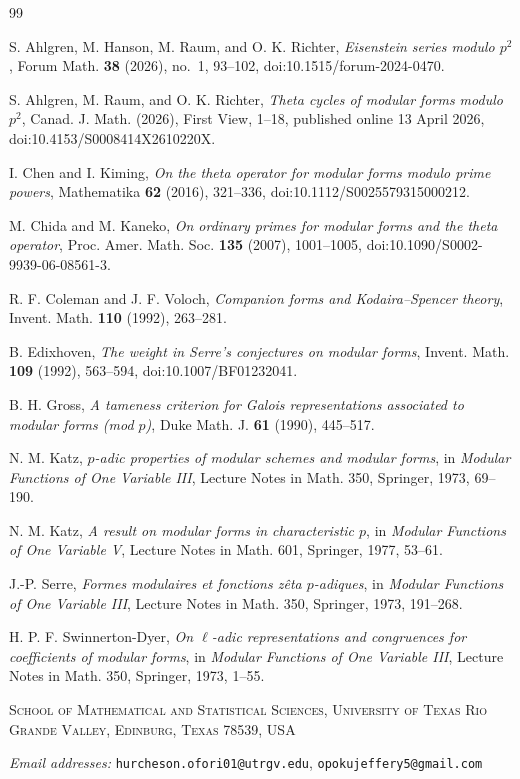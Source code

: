 \documentclass[11pt]{article}
\theoremstyle{remark}
\begin{document}
\begingroup
\small
\begin{thebibliography}{99}
\raggedright
{}
S. Ahlgren, M. Hanson, M. Raum, and O. K. Richter,
\emph{Eisenstein series modulo $p^2$},
Forum Math. \textbf{38} (2026), no.~1, 93--102,
doi:10.1515/forum-2024-0470.

S. Ahlgren, M. Raum, and O. K. Richter,
\emph{Theta cycles of modular forms modulo $p^2$},
Canad. J. Math. (2026), First View, 1--18,
published online 13 April 2026,
doi:10.4153/S0008414X2610220X.

I. Chen and I. Kiming,
\emph{On the theta operator for modular forms modulo prime powers},
Mathematika \textbf{62} (2016), 321--336,
doi:10.1112/S0025579315000212.

M. Chida and M. Kaneko,
\emph{On ordinary primes for modular forms and the theta operator},
Proc. Amer. Math. Soc. \textbf{135} (2007), 1001--1005,
doi:10.1090/S0002-9939-06-08561-3.

R. F. Coleman and J. F. Voloch,
\emph{Companion forms and Kodaira--Spencer theory},
Invent. Math. \textbf{110} (1992), 263--281.

B. Edixhoven,
\emph{The weight in Serre's conjectures on modular forms},
Invent. Math. \textbf{109} (1992), 563--594,
doi:10.1007/BF01232041.

B. H. Gross,
\emph{A tameness criterion for Galois representations associated to
modular forms (mod $p$)},
Duke Math. J. \textbf{61} (1990), 445--517.

N. M. Katz,
\emph{$p$-adic properties of modular schemes and modular forms},
in \emph{Modular Functions of One Variable III},
Lecture Notes in Math. 350, Springer, 1973, 69--190.

N. M. Katz,
\emph{A result on modular forms in characteristic $p$},
in \emph{Modular Functions of One Variable V},
Lecture Notes in Math. 601, Springer, 1977, 53--61.

J.-P. Serre,
\emph{Formes modulaires et fonctions z\^eta $p$-adiques},
in \emph{Modular Functions of One Variable III},
Lecture Notes in Math. 350, Springer, 1973, 191--268.

H. P. F. Swinnerton-Dyer,
\emph{On $\ell$-adic representations and congruences for coefficients of
modular forms},
in \emph{Modular Functions of One Variable III},
Lecture Notes in Math. 350, Springer, 1973, 1--55.

\end{thebibliography}
\endgroup

\medskip
\noindent\textsc{School of Mathematical and Statistical Sciences,
University of Texas Rio Grande Valley, Edinburg, Texas 78539, USA}

\noindent\emph{Email addresses:}
\texttt{hurcheson.ofori01@utrgv.edu},
\texttt{opokujeffery5@gmail.com}
\end{document}

